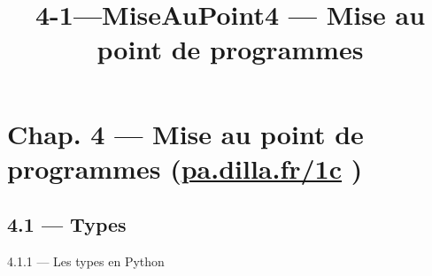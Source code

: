 \documentclass[a4paper,17pt]{extarticle}
\title{4-1---MiseAuPoint}
\begin{document}
    
    \title{4 --- Mise au point de programmes}

    
    

    
    \hypertarget{chap.-4-mise-au-point-de-programmes-pa.dilla.fr1c}{%
\section{\texorpdfstring{Chap. 4 --- Mise au point de programmes
(\href{https://pa.dilla.fr/1c}{pa.dilla.fr/1c}
)}{Chap. 4 --- Mise au point de programmes (pa.dilla.fr/1c )}}\label{chap.-4-mise-au-point-de-programmes-pa.dilla.fr1c}}

    \hypertarget{types}{%
\subsection{4.1 --- Types}\label{types}}

    4.1.1 --- Les types en Python
\end{document}
